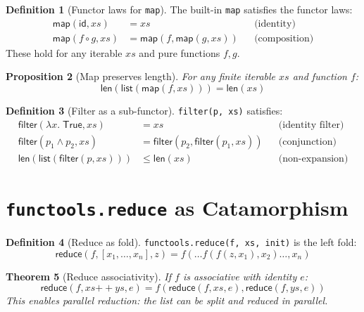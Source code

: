 \documentclass[11pt,a4paper]{report}
\theoremstyle{definition}
\newtheorem{definition}{Definition}[chapter]
\theoremstyle{plain}
\newtheorem{theorem}[definition]{Theorem}
\newtheorem{proposition}[definition]{Proposition}
\begin{document}
\begin{definition}[Functor laws for \texttt{map}]
The built-in \lstinline[style=python]{map} satisfies the functor laws:
\begin{align}
  \mathsf{map}(\mathsf{id}, xs) &= xs && \text{(identity)} \\
  \mathsf{map}(f \circ g, xs) &= \mathsf{map}(f, \mathsf{map}(g, xs)) && \text{(composition)}
\end{align}
These hold for any iterable $xs$ and pure functions $f, g$.
\end{definition}

\begin{proposition}[Map preserves length]
For any finite iterable $xs$ and function $f$:
\[
  \mathsf{len}(\mathsf{list}(\mathsf{map}(f, xs))) = \mathsf{len}(xs)
\]
\end{proposition}

\begin{definition}[Filter as a sub-functor]
\lstinline[style=python]{filter(p, xs)} satisfies:
\begin{align}
  \mathsf{filter}(\lambda x.\;\mathsf{True}, xs) &= xs && \text{(identity filter)} \\
  \mathsf{filter}(p_1 \land p_2, xs) &= \mathsf{filter}(p_2, \mathsf{filter}(p_1, xs)) && \text{(conjunction)} \\
  \mathsf{len}(\mathsf{list}(\mathsf{filter}(p, xs))) &\leq \mathsf{len}(xs) && \text{(non-expansion)}
\end{align}
\end{definition}


\section{\texttt{functools.reduce} as Catamorphism}

\begin{definition}[Reduce as fold]
\lstinline[style=python]{functools.reduce(f, xs, init)} is the left fold:
\[
  \mathsf{reduce}(f, [x_1, \ldots, x_n], z) = f(\ldots f(f(z, x_1), x_2) \ldots, x_n)
\]
\end{definition}

\begin{theorem}[Reduce associativity]
If $f$ is associative with identity $e$:
\[
  \mathsf{reduce}(f, xs \mathbin{+\!\!+} ys, e) = f(\mathsf{reduce}(f, xs, e), \mathsf{reduce}(f, ys, e))
\]
This enables \emph{parallel reduction}: the list can be split and reduced in parallel.
\end{theorem}
\end{document}
